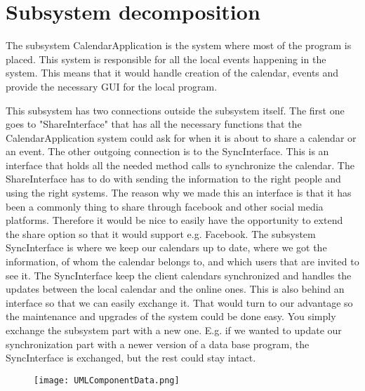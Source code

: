\section{Subsystem decomposition}
The subsystem CalendarApplication is the system where most of the program is placed. This system is responsible for all the local events happening in the system. This means that it would handle creation of the calendar, events and provide the necessary GUI for the local program. 

This subsystem has two connections outside the subsystem itself. The first one goes to "ShareInterface" that has all the necessary functions that the CalendarApplication system could ask for when it is about to share a calendar or an event. The other outgoing connection is to the SyncInterface. This is an interface that holds all the needed method calls to synchronize the calendar.
\newline
\newline
The ShareInterface has to do with sending the information to the right people and using the right systems. The reason why we made this an interface is that it has been a commonly thing to share through facebook and other social media platforms. Therefore it would be nice to easily have the opportunity to extend the share option so that it would support e.g. Facebook. 
\newline
\newline
The subsystem SyncInterface is where we keep our calendars up to date, where we got the information, of whom the calendar belongs to, and which users that are invited to see it. The SyncInterface keep the client calendars synchronized and handles the updates between the local calendar and the online ones. This is also behind an interface so that we can easily exchange it. That would turn to our advantage so the maintenance and upgrades of the system could be done easy. You simply exchange the subsystem part with a new one. E.g. if we wanted to update our synchronization part with a newer version of a data base program, the SyncInterface is exchanged, but the rest could stay intact. 
\newline
\begin{figure}[h]
\centering
\texttt{[image: UMLComponentData.png]}
\label{figur:UMLComponentData}
\end{figure}